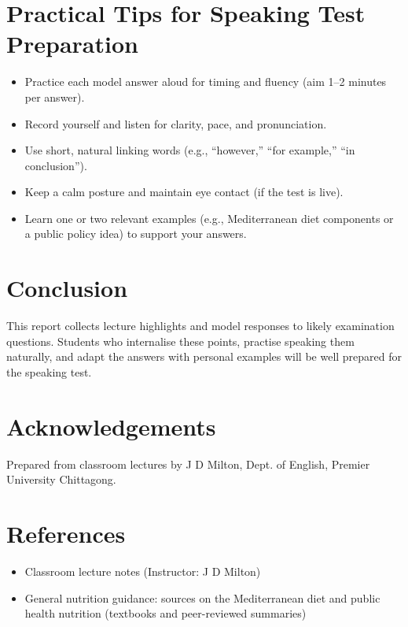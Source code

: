 \documentclass[a4paper,12pt]{article}
\begin{document}
\section*{Practical Tips for Speaking Test Preparation}
\begin{itemize}
  \item Practice each model answer aloud for timing and fluency (aim 1--2 minutes per answer).
  \item Record yourself and listen for clarity, pace, and pronunciation.
  \item Use short, natural linking words (e.g., ``however,'' ``for example,'' ``in conclusion'').
  \item Keep a calm posture and maintain eye contact (if the test is live).
  \item Learn one or two relevant examples (e.g., Mediterranean diet components or a public policy idea) to support your answers.
\end{itemize}

\section*{Conclusion}
This report collects lecture highlights and model responses to likely examination questions. Students who internalise these points, practise speaking them naturally, and adapt the answers with personal examples will be well prepared for the speaking test.

\section*{Acknowledgements}
Prepared from classroom lectures by J D Milton, Dept. of English, Premier University Chittagong.

\section*{References}
\begin{itemize}
  \item Classroom lecture notes (Instructor: J D Milton)
  \item General nutrition guidance: sources on the Mediterranean diet and public health nutrition (textbooks and peer-reviewed summaries)
\end{itemize}
\end{document}
